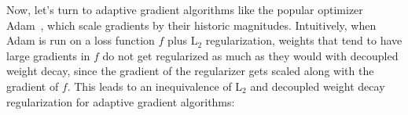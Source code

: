 \documentclass[usenames,dvipsnames]{article} %
\newcommand{\note}[1]{
	\noindent~\\
	\vspace{0.25cm}
	\fcolorbox{red}{yellow}{\parbox{0.97\textwidth}{#1\\}}
	\vspace{0.25cm}
}
\newcommand{\franknips}[1]{\textcolor{black}{#1}}
\newcommand{\vc}[1]{\textit{\textbf{#1}}}
\begin{document}


Now, let's turn to adaptive gradient algorithms like the popular optimizer Adam~\cite{kingma2014adam}, which scale gradients by their historic magnitudes. Intuitively, when Adam is run on a loss function $f$ plus L$_2$ regularization, weights that tend to have large gradients in $f$ do not get regularized as much as they would with decoupled weight decay, since the gradient of the regularizer gets scaled along with the gradient of $f$.
This leads to an inequivalence of L$_2$ and decoupled weight decay regularization for adaptive gradient algorithms:
\end{document}
